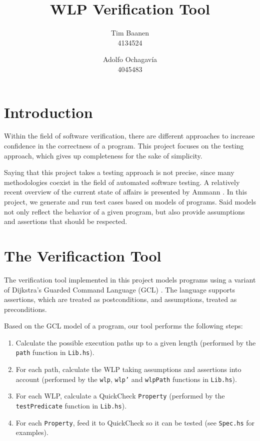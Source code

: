 \documentclass[a4paper]{article}
\author{
  Tim Baanen\\4134524
  \and
  Adolfo Ochagavía\\4045483
}
\title{WLP Verification Tool}
\begin{document}
\maketitle

\section{Introduction}

Within the field of software verification, there are different approaches to
increase confidence in the correctness of a program. This project focuses on
the testing approach, which gives up completeness for the sake of simplicity.

Saying that this project takes a testing approach is not precise,
since many methodologies coexist in the field of automated software testing. A
relatively recent overview of the current state of affairs is presented by Ammann
\cite{ammann2008introduction}. In this project, we generate and run test cases
based on models of programs. Said models not only reflect the behavior of a
given program, but also provide assumptions and assertions that should be respected.

\section{The Verificaction Tool}

The verification tool implemented in this project models programs using a
variant of Dijkstra's Guarded Command Language (GCL) \cite{Dijkstra:gcl}.
The language supports assertions, which are treated as postconditions,
and assumptions, treated as preconditions.

Based on the GCL model of a program, our tool performs the following steps:

\begin{enumerate}
\item Calculate the possible execution paths up to a given length (performed by
the \texttt{path} function in \texttt{Lib.hs}).
\item For each path, calculate the WLP taking assumptions and assertions into account
(performed by the \texttt{wlp}, \texttt{wlp'} and \texttt{wlpPath} functions in \texttt{Lib.hs}).
\item For each WLP, calculate a QuickCheck \cite{claessen2011quickcheck} \texttt{Property}
(performed by the \texttt{testPredicate} function in \texttt{Lib.hs}).
\item For each \texttt{Property}, feed it to QuickCheck so it can be tested (see
\texttt{Spec.hs} for examples).
\end{enumerate}
\end{document}
